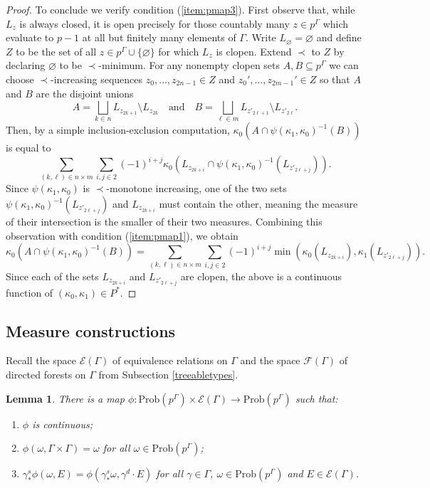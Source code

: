 \documentclass[12pt]{amsart}
\newtheorem{lem}[thm]{Lemma}
\theoremstyle{definition}
\def\cal{\mathcal}
\newcommand{\Prob}{\mathrm{Prob}}
\begin{document}
\begin{proof}
	To conclude we verify condition (\ref{item:pmap3}). First observe that, while $L_z$ is always closed, it is open precisely for those countably many $z \in p^\Gamma$ which evaluate to $p-1$ at all but finitely many elements of $\Gamma$. Write $L_\varnothing = \varnothing$ and define $Z$ to be the set of all $z \in p^\Gamma \cup \{\varnothing\}$ for which $L_z$ is clopen. Extend $\prec$ to $Z$ by declaring $\varnothing$ to be $\prec$-minimum. For any nonempty clopen sets $A, B \subseteq p^\Gamma$ we can choose $\prec$-increasing sequences $z_0, \ldots, z_{2n-1} \in Z$ and $z_0', \ldots, z_{2m-1}' \in Z$ so that $A$ and $B$ are the disjoint unions
	\[A = \bigsqcup_{k \in n} L_{z_{2k+1}} \setminus L_{z_{2k}} \quad \text{and} \quad B = \bigsqcup_{\ell \in m} L_{z'_{2\ell+1}} \setminus L_{z'_{2\ell}}.\]
	Then, by a simple inclusion-exclusion computation, $\kappa_0(A \cap \psi(\kappa_1,\kappa_0)^{-1}(B))$ is equal to
	\[\sum_{(k, \ell) \in n \times m} \sum_{i,j \in 2} (-1)^{i+j} \kappa_0 \left(L_{z_{2k+i}} \cap \psi(\kappa_1,\kappa_0)^{-1}(L_{z'_{2\ell+j}}) \right).\]
	Since $\psi(\kappa_1, \kappa_0)$ is $\prec$-monotone increasing, one of the two sets $\psi(\kappa_1,\kappa_0)^{-1}(L_{z'_{2\ell+j}})$ and $L_{z_{2k+i}}$ must contain the other, meaning the measure of their intersection is the smaller of their two measures. Combining this observation with condition (\ref{item:pmap1}), we obtain
	\[\kappa_0(A \cap \psi(\kappa_1,\kappa_0)^{-1}(B)) = \sum_{(k, \ell) \in n \times m} \sum_{i,j \in 2} (-1)^{i+j} \min \left(\kappa_0(L_{z_{2k+i}}), \kappa_1(L_{z'_{2\ell+j}})\right).\]
	Since each of the sets $L_{z_{2k+i}}$ and $L_{z'_{2\ell+j}}$ are clopen, the above is a continuous function of $(\kappa_0, \kappa_1) \in P^*$.
\end{proof}

\subsection{Measure constructions}

Recall the space $\cal E(\Gamma)$ of equivalence relations on $\Gamma$ and the space $\cal F(\Gamma)$ of directed forests on $\Gamma$ from Subsection \ref{treeabletypes}.

\begin{lem} \label{lem:srmap}
	There is a map $\phi : \Prob(p^\Gamma) \times \cal E(\Gamma) \rightarrow \Prob(p^\Gamma)$ such that:
	\begin{enumerate}
		\item \label{item:srmap1} $\phi$ is continuous;
		\item \label{item:srmap3} $\phi(\omega, \Gamma \times \Gamma) = \omega$ for all $\omega \in \Prob(p^\Gamma)$;
		\item \label{item:srmap2} $\gamma^s_* \phi(\omega, E) = \phi(\gamma^s_* \omega, \gamma^d \cdot E)$ for all $\gamma \in \Gamma$, $\omega \in \Prob(p^\Gamma)$ and $E \in \cal E(\Gamma)$.
	\end{enumerate}
\end{lem}
\end{document}
